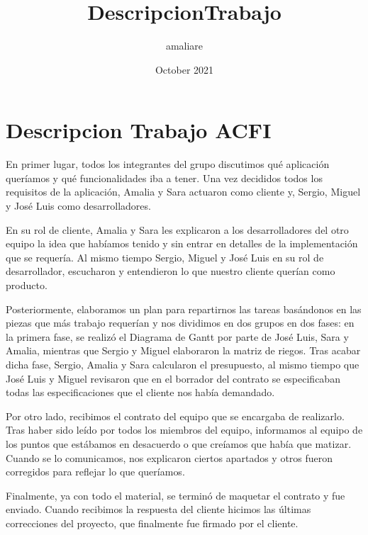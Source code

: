 \documentclass{article}
\title{DescripcionTrabajo}
\author{amaliare }
\date{October 2021}
\begin{document}
\section*{Descripcion Trabajo ACFI}

En primer lugar, todos los integrantes del grupo discutimos qué aplicación
queríamos y qué funcionalidades iba a tener. Una vez decididos todos los
requisitos de la aplicación, Amalia y Sara actuaron como cliente y,
Sergio, Miguel y José Luis como desarrolladores.

En su rol de cliente, Amalia y Sara les explicaron a los desarrolladores del
otro equipo la idea que habíamos tenido y sin entrar en detalles de
la implementación que se requería. Al mismo tiempo Sergio, Miguel y José Luis
en su rol de desarrollador, escucharon y entendieron lo que nuestro cliente
querían como producto.

Posteriormente, elaboramos un plan para repartirnos las tareas basándonos en las
piezas que más trabajo requerían y nos dividimos en dos grupos en dos fases: en
la primera fase, se realizó el Diagrama de Gantt por parte de José Luis, Sara
y Amalia, mientras que Sergio y Miguel elaboraron la matriz de riegos.
Tras acabar dicha fase, Sergio, Amalia y Sara calcularon el presupuesto, al
mismo tiempo que José Luis y Miguel revisaron que en  el borrador del contrato
se especificaban todas las especificaciones que el cliente nos había demandado.

Por otro lado, recibimos el contrato del equipo que se encargaba de realizarlo.
Tras haber sido leído por todos los miembros del equipo, informamos al equipo de
los puntos que estábamos en desacuerdo o que creíamos que había que matizar.
Cuando se lo comunicamos, nos explicaron ciertos apartados y otros fueron
corregidos para reflejar lo que queríamos.


Finalmente, ya con todo el material, se terminó de maquetar el contrato y fue enviado.
Cuando recibimos la respuesta del cliente hicimos las últimas correcciones del
proyecto, que finalmente fue firmado por el cliente.
\end{document}
